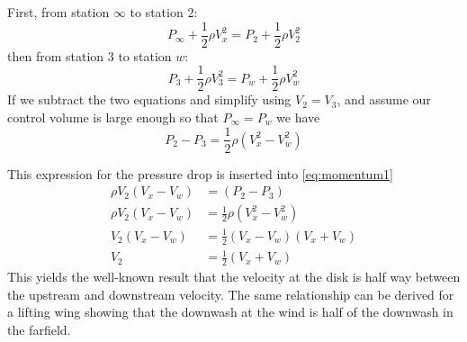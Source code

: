 \documentclass{article}
\begin{document}
First, from station $\infty$ to station 2:
\begin{equation}
    P_\infty + \frac{1}{2}\rho V_x^2 = P_2 + \frac{1}{2}\rho V_2^2
\end{equation}
then from station 3 to station $w$:
\begin{equation}
    P_3 + \frac{1}{2}\rho V_3^2 = P_w + \frac{1}{2}\rho V_w^2
\end{equation}
If we subtract the two equations and simplify using $V_2 = V_3$, and assume our control volume is large enough so that $P_\infty = P_w$ we have
\begin{equation}
    P_2 - P_3 = \frac{1}{2}\rho (V_x^2 - V_w^2)
\end{equation}

This expression for the pressure drop is inserted into \cref{eq:momentum1}
\begin{equation}
\begin{aligned}
    \rho V_2 (V_x - V_w) &= (P_2 - P_3)\\
    \rho V_2 (V_x - V_w) &= \frac{1}{2}\rho (V_x^2 - V_w^2)\\
    V_2 (V_x - V_w) &= \frac{1}{2} (V_x - V_w)(V_x + V_w)\\
    V_2 &= \frac{1}{2} (V_x + V_w)
\end{aligned}
\end{equation}
This yields the well-known result that the velocity at the disk is half way between the upstream and downstream velocity.  The same relationship can be derived for a lifting wing showing that the downwash at the wind is half of the downwash in the farfield.
\end{document}
